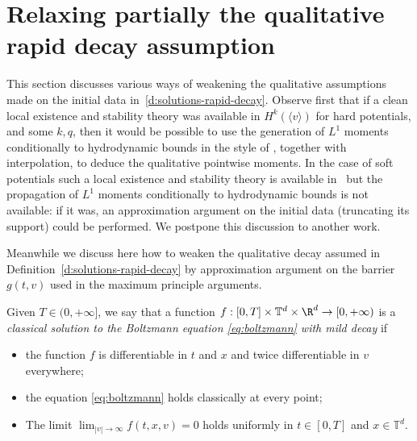 \section{Relaxing partially the qualitative rapid decay assumption}
\label{s:no-decay}

This section discusses various ways of weakening the qualitative
assumptions made on the initial data
in~\ref{d:solutions-rapid-decay}. Observe first that if a clean local
existence and stability theory was available in
$H^{k}(\langle v \rangle)$ for hard potentials, and some $k,q$, then
it would be possible to use the generation of $L^1$ moments
conditionally to hydrodynamic bounds in the style of
\cite[\S 5.3.1]{GMM}, together with interpolation, to deduce
the qualitative pointwise moments. In the case of soft potentials such
a local existence and stability theory is available
in~\cite{MR3376931} but the propagation of $L^1$ moments conditionally
to hydrodynamic bounds is not available: if it was, an approximation
argument on the initial data (truncating its support) could be
performed. We postpone this discussion to another work.

Meanwhile we discuss here how to weaken the qualitative decay assumed
in Definition~\ref{d:solutions-rapid-decay} by approximation argument
on the barrier $g(t,v)$ used in the maximum principle arguments.


\begin{defn} \label{d:solutions-no-decay} Given $T \in (0,+\infty]$, we
say that a function
$f : [0,T] \times \mathbb T^d \times \R^d \to [0,+\infty)$ is a
\emph{classical solution to the Boltzmann equation
\eqref{eq:boltzmann} with mild decay} if
\begin{itemize}
\item the function $f$ is differentiable in $t$ and $x$ and twice
differentiable in $v$ everywhere;
\item the equation \eqref{eq:boltzmann} holds classically at every
point;
\item The limit $\lim_{|v| \to \infty} f(t,x,v) = 0$ holds uniformly
in $t \in [0,T]$ and $x \in \mathbb{T}^d$.
\end{itemize}
\end{defn}


